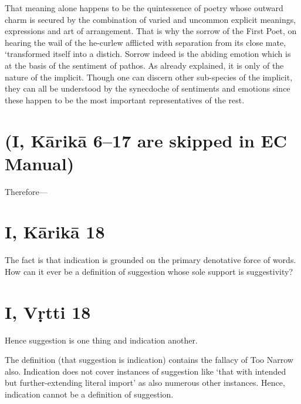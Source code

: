 \documentclass[12pt]{book}
\begin{document}
That meaning alone happens to be the quintessence of poetry
whose outward charm is secured by the combination of varied
and uncommon explicit meanings, expressions and art of arrangement. That is why the sorrow of the First Poet, on hearing the
wail of the he-curlew afflicted with separation from its close mate,
`transformed itself into a distich. Sorrow indeed is the abiding
emotion which is at the basis of the sentiment of pathos. As
already explained, it is only of the nature of the implicit. Though
one can discern other sub-species of the implicit, they can all
be understood by the synecdoche of sentiments and emotions
since these happen to be the most important representatives of
the rest.



\section{(I, Kārikā 6--17 are skipped in EC Manual)}

Therefore---


\section{I, Kārikā 18}

The fact is that indication is grounded on the primary
denotative force of words. How can it ever be a definition
of suggestion whose sole support is suggestivity?

\section{I, Vṛtti 18}

Hence suggestion is one thing and indication another.

The definition (that suggestion is indication) contains the
fallacy of Too Narrow also. Indication does not cover instances
of suggestion like `that with intended but further-extending
literal import' as also numerous other instances. Hence, indication cannot be a definition of suggestion.





\end{document}

